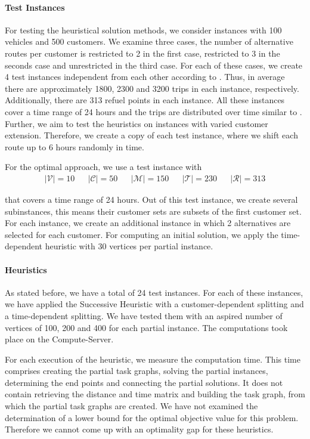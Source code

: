 \paragraph{Test Instances} \parfill

For testing the heuristical solution methods, we consider instances with 100 vehicles and 500 customers. We examine three cases, the number of alternative routes per customer is restricted to 2 in the first case, restricted to 3 in the seconds case and unrestricted in the third case. For each of these cases, we create 4 test instances independent from each other according to . Thus, in average there are approximately 1800, 2300 and 3200 trips in each instance, respectively. Additionally, there are 313 refuel points in each instance. All these instances cover a time range of 24 hours and the trips are distributed over time similar to . Further, we aim to test the heuristics on instances with varied customer extension. Therefore, we create a copy of each test instance, where we shift each route up to 6 hours randomly in time.

For the optimal approach, we use a test instance with
\begin{align*}
	\vert\mathcal{V}\vert = 10 && \vert\mathcal{C}\vert = 50 && \vert\mathcal{M}\vert = 150 && \vert\mathcal{T}\vert = 230 && \vert\mathcal{R}\vert = 313
\end{align*}

that covers a time range of 24 hours. Out of this test instance, we create several subinstances, this means their customer sets are subsets of the first customer set. For each instance, we create an additional instance in which 2 alternatives are selected for each customer. For computing an initial solution, we apply the time-dependent heuristic with 30 vertices per partial instance.

\paragraph{Heuristics} \parfill

As stated before, we have a total of 24 test instances. For each of these instances, we have applied the Successive Heuristic with a customer-dependent splitting and a time-dependent splitting. We have tested them with an aspired number of vertices of 100, 200 and 400 for each partial instance. The computations took place on the Compute-Server.

For each execution of the heuristic, we measure the computation time. This time comprises creating the partial task graphs, solving the partial instances, determining the end points and connecting the partial solutions. It does not contain retrieving the distance and time matrix and building the task graph, from which the partial task graphs are created. We have not examined the determination of a lower bound for the optimal objective value for this problem. Therefore we cannot come up with an optimality gap for these heuristics.

